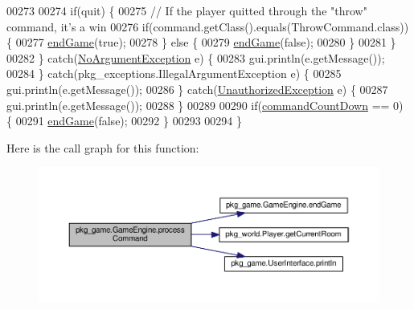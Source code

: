 \begin{DoxyCode}
00273 
00274             \textcolor{keywordflow}{if}(quit) \{
00275                 \textcolor{comment}{// If the player quitted through the "throw" command, it's a win}
00276                 \textcolor{keywordflow}{if}(command.getClass().equals(ThrowCommand.class)) \{
00277                     \hyperlink{classpkg__game_1_1GameEngine_a6d7340637e1eb46994a494c149442a22}{endGame}(\textcolor{keyword}{true});
00278                 \} \textcolor{keywordflow}{else} \{
00279                     \hyperlink{classpkg__game_1_1GameEngine_a6d7340637e1eb46994a494c149442a22}{endGame}(\textcolor{keyword}{false});
00280                 \}
00281             \}
00282         \} \textcolor{keywordflow}{catch}(\hyperlink{classpkg__exceptions_1_1NoArgumentException}{NoArgumentException} e) \{
00283             gui.println(e.getMessage());
00284         \} \textcolor{keywordflow}{catch}(pkg\_exceptions.IllegalArgumentException e) \{
00285             gui.println(e.getMessage());
00286         \} \textcolor{keywordflow}{catch}(\hyperlink{classpkg__exceptions_1_1UnauthorizedException}{UnauthorizedException} e) \{
00287             gui.println(e.getMessage());
00288         \}
00289 
00290         \textcolor{keywordflow}{if}(\hyperlink{classpkg__game_1_1GameEngine_af4ea44f51563b4e2c0a67fe918bf5e3c}{commandCountDown} == 0) \{
00291             \hyperlink{classpkg__game_1_1GameEngine_a6d7340637e1eb46994a494c149442a22}{endGame}(\textcolor{keyword}{false});
00292         \}
00293 
00294     \}
\end{DoxyCode}


Here is the call graph for this function\-:
\nopagebreak
\begin{figure}[H]
\begin{center}
\leavevmode
\includegraphics[width=350pt]{classpkg__game_1_1GameEngine_a37887ae202eadba82495da82ac4e1908_cgraph}
\end{center}
\end{figure}


